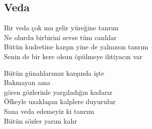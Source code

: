 \subsection{Veda}

Bir veda çok mu gelir yüreğine tanrım \\
Ne olurdu birbirini sevse tüm canlılar \\
Bütün kudretine karşın yine de yalnızsın tanrım \\
Senin de bir kere olsun öpülmeye ihtiyacın var

\noindent\newline
Bütün günahlarımız karşında işte \\
Bakmayan ama \\
gören gözlerinle yargıladığın kadarız \\
Öfkeyle uzaklaşan kalplere duyurulur \\
Sana veda edemeyiz ki tanrım \\
Bütün sözler yarım kalır